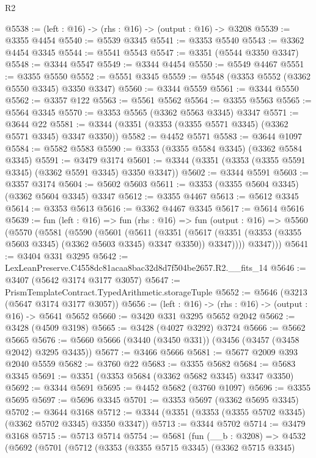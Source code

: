 \begin{lexlean}{R2}
\begin{coremodule}
@5538 := (left : @16) -> (rhs : @16) -> (output : @16) -> @3208
@5539 := @3355 @4454
@5540 := @5539 @3345
@5541 := @3353 @5540
@5543 := @3362 @4454 @3345
@5544 := @5541 @5543
@5547 := @3351 (@5544 @3350 @3347)
@5548 := @3344 @5547
@5549 := @3344 @4454
@5550 := @5549 @4467
@5551 := @3355 @5550
@5552 := @5551 @3345
@5559 := @5548 (@3353 @5552 (@3362 @5550 @3345) @3350 @3347)
@5560 := @3344 @5559
@5561 := @3344 @5550
@5562 := @3357 @122
@5563 := @5561 @5562
@5564 := @3355 @5563
@5565 := @5564 @3345
@5570 := @3353 @5565 (@3362 @5563 @3345) @3347
@5571 := @3644 @22
@5581 := @3344 (@3351 (@3353 (@3355 @5571 @3345) (@3362 @5571 @3345) @3347 @3350))
@5582 := @4452 @5571
@5583 := @3644 @1097
@5584 := @5582 @5583
@5590 := @3353 (@3355 @5584 @3345) (@3362 @5584 @3345)
@5591 := @3479 @3174
@5601 := @3344 (@3351 (@3353 (@3355 @5591 @3345) (@3362 @5591 @3345) @3350 @3347))
@5602 := @3344 @5591
@5603 := @3357 @3174
@5604 := @5602 @5603
@5611 := @3353 (@3355 @5604 @3345) (@3362 @5604 @3345) @3347
@5612 := @3355 @4467
@5613 := @5612 @3345
@5614 := @3353 @5613
@5616 := @3362 @4467 @3345
@5617 := @5614 @5616
@5639 := fun (left : @16) =>
  fun (rhs : @16) =>
  fun (output : @16) =>
  @5560
    (@5570
      (@5581
        (@5590
          (@5601
            (@5611
              (@3351
                (@5617 (@3351 (@3353 (@3355 @5603 @3345) (@3362 @5603 @3345) @3347 @3350)) @3347))))
          @3347)))
@5641 := @3404 @331 @3295
@5642 := LexLeanPreserve.C4558dc81acaa8bac32d8d7f504be2657.R2.__fits_14
@5646 := @3407 (@5642 @3174 @3177 @3057)
@5647 := PrismTemplateContract.TypedArithmetic.storageTuple
@5652 := @5646 (@3213 (@5647 @3174 @3177 @3057))
@5656 := (left : @16) -> (rhs : @16) -> (output : @16) -> @5641 @5652
@5660 := @3420 @331 @3295 @5652 @2042
@5662 := @3428 (@4509 @3198)
@5665 := @3428 (@4027 @3292) @3724
@5666 := @5662 @5665
@5676 := @5660 @5666 (@3440 (@3450 @331)) (@3456 (@3457 (@3458 @2042) @3295 @3435))
@5677 := @3466 @5666
@5681 := @5677 @2009 @393 @2040 @5559
@5682 := @3760 @22
@5683 := @3355 @5682
@5684 := @5683 @3345
@5691 := @3351 (@3353 @5684 (@3362 @5682 @3345) @3347 @3350)
@5692 := @3344 @5691
@5695 := @4452 @5682 (@3760 @1097)
@5696 := @3355 @5695
@5697 := @5696 @3345
@5701 := @3353 @5697 (@3362 @5695 @3345)
@5702 := @3644 @3168
@5712 := @3344 (@3351 (@3353 (@3355 @5702 @3345) (@3362 @5702 @3345) @3350 @3347))
@5713 := @3344 @5702
@5714 := @3479 @3168
@5715 := @5713 @5714
@5754 := @5681
    (fun (__b : @3208) =>
    @4532
      (@5692
        (@5701
          (@5712
            (@3353
              (@3355 @5715 @3345)
              (@3362 @5715 @3345)

\end{coremodule}
\end{lexlean}
